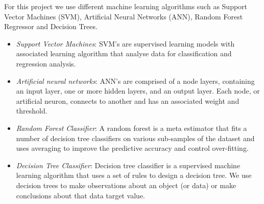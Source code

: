 \documentclass[11pt,conference]{IEEEtran}
\begin{document}
For this project we use different machine learning algorithms such as Support Vector Machines (SVM), Artificial Neural Networks (ANN), Random Forest Regressor and Decision Trees. 
\begin{itemize}
\item \emph{Support Vector Machines}: SVM’s are supervised learning models with associated learning algorithm that analyse data for classification and regression analysis.
\item \emph{Artificial neural networks}: ANN’s are comprised of a node layers, containing an input layer, one or more hidden layers, and an output layer. Each node, or artificial neuron, connects to another and has an associated weight and threshold.
\item \emph{Random Forest Classifier}: A random forest is a meta estimator that fits a number of decision tree classifiers on various sub-samples of the dataset and uses averaging to improve the predictive accuracy and control over-fitting.
\item \emph{Decision Tree Classifier}: Decision tree classifier is a supervised machine learning algorithm that uses a set of rules to design a decision tree. We use decision trees to make observations about an object (or data) or make conclusions about that data target value.
\end{itemize}
\end{document}

